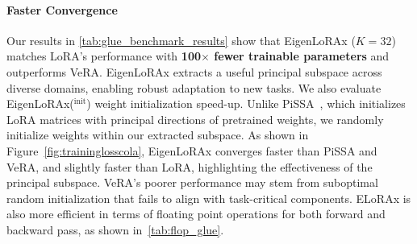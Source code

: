 \paragraph{Faster Convergence} Our results in \autoref{tab:glue_benchmark_results} show that EigenLoRAx ($K=32$) matches LoRA's performance with \textbf{100$\times$ fewer trainable parameters} and outperforms VeRA. EigenLoRAx extracts a useful principal subspace across diverse domains, enabling robust adaptation to new tasks. We also evaluate EigenLoRAx($^\text{init}$) weight initialization speed-up. Unlike PiSSA~\citep{meng_pissa_2024}, which initializes LoRA matrices with principal directions of pretrained weights, we randomly initialize weights within our extracted subspace. As shown in Figure~\ref{fig:traininglosscola}, EigenLoRAx converges faster than PiSSA and VeRA, and slightly faster than LoRA, highlighting the effectiveness of the principal subspace. VeRA's poorer performance may stem from suboptimal random initialization that fails to align with task-critical components. ELoRAx is also more efficient in terms of floating point operations for both forward and backward pass, as shown in~\cref{tab:flop_glue}. 
